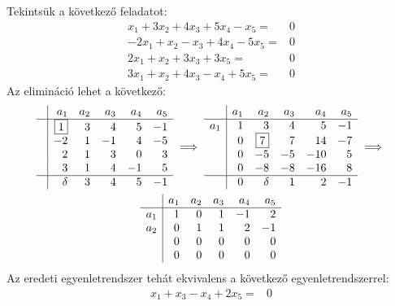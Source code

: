 \documentclass[9pt, showtrims]{memoir}
\theoremstyle{plain}
\theoremstyle{remark}
\theoremstyle{definition}
\begin{document}
\begin{enumerate}
        Tekintsük a következő feladatot:
        \[
            \begin{array}{rl}
                x_1+3x_2+4x_3+5x_4-x_5=&0\\
                -2x_1+x_2-x_3+4x_4-5x_5=&0\\
                2x_1+x_2+3x_3+3x_5=&0\\
                3x_1+x_2+4x_3-x_4+5x_5=&0
            \end{array}
        \]
        Az elimináció lehet a következő:
        \begin{multline*}
            \begin{array}{r|rrrrr}
                &a_1&a_2&a_3&a_4&a_5\\
                \hline
                &\boxed{1}&3&4&5&-1\\
                &-2&1&-1&4&-5\\
                &2&1&3&0&3\\
                &3&1&4&-1&5\\
                \hline
                &\delta&3&4&5&-1
            \end{array}
            \implies
            \begin{array}{r|rrrrr}
                &a_1&a_2&a_3&a_4&a_5\\
                \hline
                a_1&1&3&4&5&-1\\
                &0&\boxed{7}&7&14&-7\\
                &0&-5&-5&-10&5\\
                &0&-8&-8&-16&8\\
                \hline
                &0&\delta&1&2&-1
            \end{array}
            \implies
            \\
            \begin{array}{r|rrrrr}
                &a_1&a_2&a_3&a_4&a_5\\
                \hline
                a_1&1&0&1&-1&2\\
                a_2&0&1&1&2&-1\\
                &0&0&0&0&0\\
                &0&0&0&0&0
            \end{array}
        \end{multline*}
        Az eredeti egyenletrendszer tehát ekvivalens a következő egyenletrendszerrel:
        \[
            \begin{array}{rl}
                x_1+x_3-x_4+2x_5=&0\\

\end{array}\]
\end{enumerate}
\end{document}
